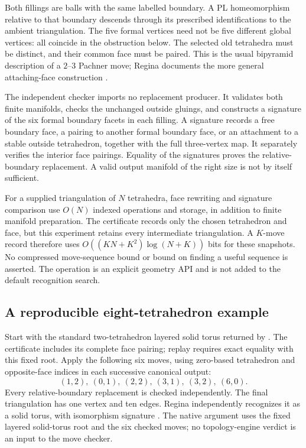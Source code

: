 Both fillings are balls with the same labelled boundary. A PL
homeomorphism relative to that boundary descends through its prescribed
identifications to the ambient triangulation. The five formal vertices need
not be five different global vertices: all coincide in the obstruction
below. The selected old tetrahedra must be distinct, and their common face
must be paired. This is the usual bipyramid description of a $2$--$3$
Pachner move; Regina documents the more general attaching-face construction
\cite{regina-pachner}.

The independent checker imports no replacement producer. It validates both
finite manifolds, checks the unchanged outside gluings, and constructs a
signature of the six formal boundary facets in each filling. A signature
records a free boundary face, a pairing to another formal boundary face, or
an attachment to a stable outside tetrahedron, together with the full
three-vertex map. It separately verifies the interior face pairings.
Equality of the signatures proves the relative-boundary replacement.
A valid output manifold of the right size is not by itself sufficient.

For a supplied triangulation of $N$ tetrahedra, face rewriting and signature
comparison use $O(N)$ indexed operations and storage, in addition to finite
manifold preparation. The certificate records only the chosen tetrahedron
and face, but this experiment retains every intermediate triangulation.
A $K$-move record therefore uses
$O((KN+K^2)\log(N+K))$ bits for these snapshots. No compressed move-sequence
bound or bound on finding a useful sequence is asserted. The operation is
an explicit geometry API and is not added to the default recognition search.

\subsection{A reproducible eight-tetrahedron example}

Start with the standard two-tetrahedron layered solid torus returned by
. The certificate includes its complete face pairing;
replay requires exact equality with this fixed root. Apply the following
six moves, using zero-based tetrahedron and opposite-face indices in each
successive canonical output:
\[
 (1,2),\ (0,1),\ (2,2),\ (3,1),\ (3,2),\ (6,0).
\]
Every relative-boundary replacement is checked independently. The final
triangulation has one vertex and ten edges. Regina independently recognizes
it as a solid torus, with isomorphism signature
. The native argument uses the fixed layered
solid-torus root and the six checked moves; no topology-engine verdict is
an input to the move checker.

